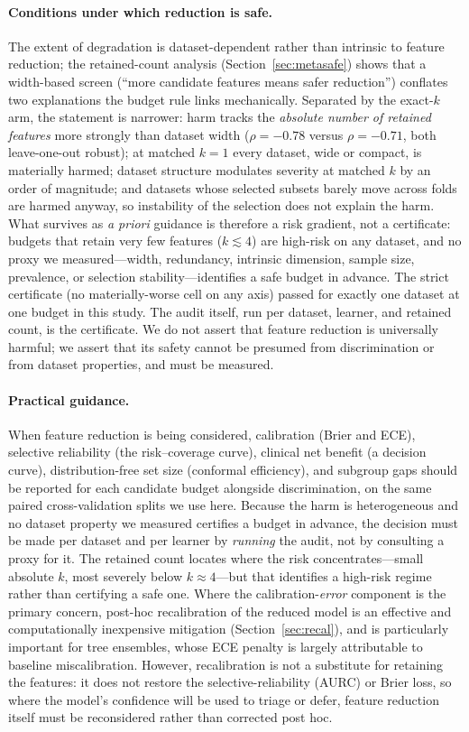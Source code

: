 \documentclass[fleqn,10pt]{wlscirep}
\newcommand{\result}[1]{#1}
\begin{document}
\paragraph{Conditions under which reduction is safe.} The extent of degradation is
dataset-dependent rather than intrinsic to feature reduction; the retained-count analysis
(Section~\ref{sec:metasafe}) shows that a width-based screen (``more candidate features means safer
reduction'') conflates two explanations the budget rule links mechanically.
Separated by the exact-$k$ arm, the statement is narrower: harm tracks the \emph{absolute
number of retained features} more strongly than dataset width ($\rho=\result{-0.78}$ versus
$\rho=\result{-0.71}$,
both leave-one-out robust); at matched $k=1$ every dataset, wide or compact, is materially harmed;
dataset structure modulates severity at matched $k$ by an order of magnitude; and datasets whose
selected subsets barely move across folds are harmed anyway, so instability of the selection does
not explain the harm. What survives as \emph{a priori} guidance is
therefore a risk gradient, not a certificate: budgets that retain very few features
($k\lesssim4$) are high-risk on any dataset, and no proxy we measured---width, redundancy, intrinsic
dimension, sample size, prevalence, or selection stability---identifies a safe budget in advance. The
strict certificate (no materially-worse cell on any axis) passed for exactly one dataset at one
budget in this study. The audit itself, run per dataset, learner, and retained count, is the
certificate. We do not assert that feature reduction is universally harmful; we assert that its
safety cannot be presumed from discrimination or from dataset properties, and must be measured.

\paragraph{Practical guidance.} When feature reduction is being considered, calibration (Brier
and ECE), selective reliability (the risk--coverage curve), clinical net benefit (a decision curve),
distribution-free set size (conformal efficiency), and subgroup gaps should be reported
for each candidate budget alongside discrimination, on the same paired cross-validation splits we
use here. Because the harm is heterogeneous and no dataset property we measured certifies a budget in
advance, the decision must be made per dataset and per learner by \emph{running} the audit, not by
consulting a proxy for it. The retained count locates where the risk concentrates---small absolute
$k$, most severely below $k\approx\result{4}$---but that identifies a high-risk regime rather than
certifying a safe one. Where the calibration-\emph{error} component is the primary concern,
post-hoc recalibration of the reduced model is an effective and computationally inexpensive mitigation
(Section~\ref{sec:recal}), and is particularly important for tree ensembles, whose ECE penalty is
largely attributable to baseline miscalibration. However, recalibration is not a substitute for
retaining the features: it does not restore the selective-reliability (AURC) or Brier loss, so where the
model's confidence will be used to triage or defer, feature reduction itself must be reconsidered rather
than corrected post hoc.
\end{document}
